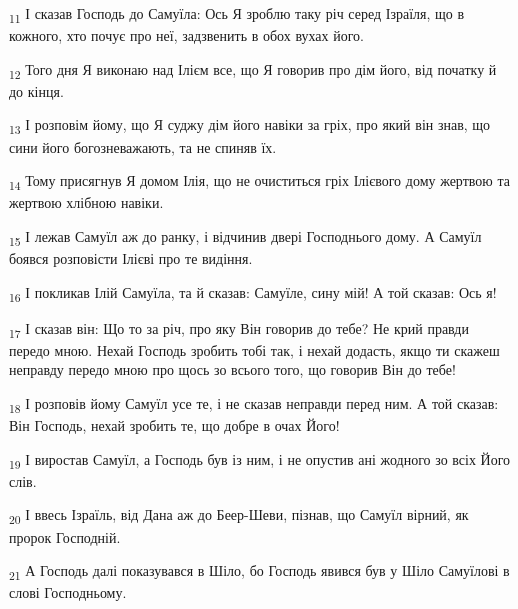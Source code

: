 \begin{tcolorbox}
\textsubscript{11} І сказав Господь до Самуїла: Ось Я зроблю таку річ серед Ізраїля, що в кожного, хто почує про неї, задзвенить в обох вухах його.
\end{tcolorbox}
\begin{tcolorbox}
\textsubscript{12} Того дня Я виконаю над Ілієм все, що Я говорив про дім його, від початку й до кінця.
\end{tcolorbox}
\begin{tcolorbox}
\textsubscript{13} І розповім йому, що Я суджу дім його навіки за гріх, про який він знав, що сини його богозневажають, та не спиняв їх.
\end{tcolorbox}
\begin{tcolorbox}
\textsubscript{14} Тому присягнув Я домом Ілія, що не очиститься гріх Ілієвого дому жертвою та жертвою хлібною навіки.
\end{tcolorbox}
\begin{tcolorbox}
\textsubscript{15} І лежав Самуїл аж до ранку, і відчинив двері Господнього дому. А Самуїл боявся розповісти Ілієві про те видіння.
\end{tcolorbox}
\begin{tcolorbox}
\textsubscript{16} І покликав Ілій Самуїла, та й сказав: Самуїле, сину мій! А той сказав: Ось я!
\end{tcolorbox}
\begin{tcolorbox}
\textsubscript{17} І сказав він: Що то за річ, про яку Він говорив до тебе? Не крий правди передо мною. Нехай Господь зробить тобі так, і нехай додасть, якщо ти скажеш неправду передо мною про щось зо всього того, що говорив Він до тебе!
\end{tcolorbox}
\begin{tcolorbox}
\textsubscript{18} І розповів йому Самуїл усе те, і не сказав неправди перед ним. А той сказав: Він Господь, нехай зробить те, що добре в очах Його!
\end{tcolorbox}
\begin{tcolorbox}
\textsubscript{19} І виростав Самуїл, а Господь був із ним, і не опустив ані жодного зо всіх Його слів.
\end{tcolorbox}
\begin{tcolorbox}
\textsubscript{20} І ввесь Ізраїль, від Дана аж до Беер-Шеви, пізнав, що Самуїл вірний, як пророк Господній.
\end{tcolorbox}
\begin{tcolorbox}
\textsubscript{21} А Господь далі показувався в Шіло, бо Господь явився був у Шіло Самуїлові в слові Господньому.
\end{tcolorbox}
